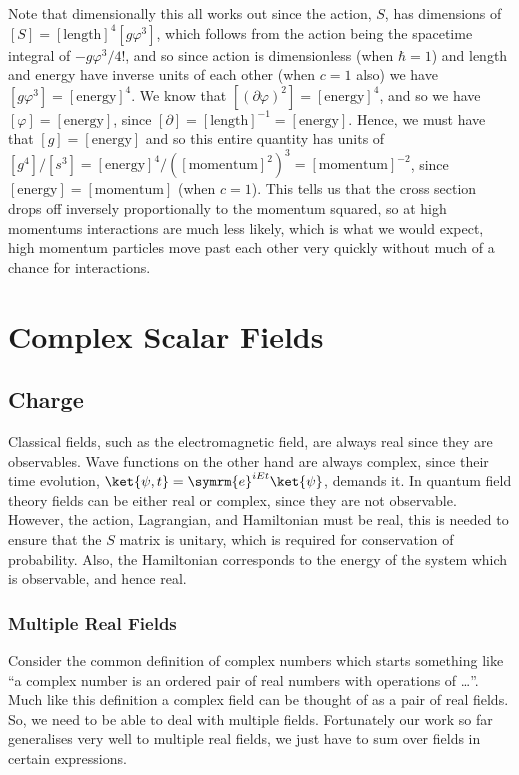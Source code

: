 \documentclass[fleqn]{NotesClass}
\newcommand{\e}{\symrm{e}}
\begin{document}
    Note that dimensionally this all works out since the action, \(S\), has dimensions of \([S] = [\text{length}]^4[g\varphi^3]\), which follows from the action being the spacetime integral of \(-g\varphi^3/4!\), and so since action is dimensionless (when \(\hbar = 1\)) and length and energy have inverse units of each other (when \(c = 1\) also) we have \([g\varphi^3] = [\text{energy}]^4\).
    We know that \([(\partial \varphi)^2] = [\text{energy}]^4\), and so we have \([\varphi] = [\text{energy}]\), since \([\partial] = [\text{length}]^{-1} = [\text{energy}]\).
    Hence, we must have that \([g] = [\text{energy}]\) and so this entire quantity has units of \([g^4]/[s^3] = [\text{energy}]^4/([\text{momentum}]^2)^3 = [\text{momentum}]^{-2}\), since \([\text{energy}] = [\text{momentum}]\) (when \(c = 1\)).
    This tells us that the cross section drops off inversely proportionally to the momentum squared, so at high momentums interactions are much less likely, which is what we would expect, high momentum particles move past each other very quickly without much of a chance for interactions.
    
    \part{Complex Scalar Fields}
    \chapter{Charge}
    Classical fields, such as the electromagnetic field, are always real since they are observables.
    Wave functions on the other hand are always complex, since their time evolution, \(\ket{\psi, t} = \e^{iEt}\ket{\psi}\), demands it.
    In quantum field theory fields can be either real or complex, since they are not observable.
    However, the action, Lagrangian, and Hamiltonian must be real, this is needed to ensure that the \(S\) matrix is unitary, which is required for conservation of probability.
    Also, the Hamiltonian corresponds to the energy of the system which is observable, and hence real.
    
    \section{Multiple Real Fields}
    Consider the common definition of complex numbers which starts something like \enquote{a complex number is an ordered pair of real numbers with operations of \dots}.
    Much like this definition a complex field can be thought of as a pair of real fields.
    So, we need to be able to deal with multiple fields.
    Fortunately our work so far generalises very well to multiple real fields, we just have to sum over fields in certain expressions.
    
\end{document}
